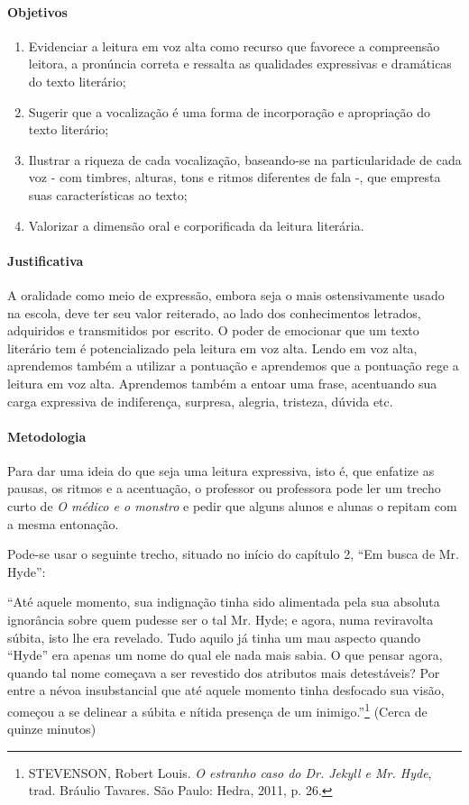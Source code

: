 \documentclass[12pt]{extarticle}
\begin{document}
{\paragraph{Objetivos}
\begin{enumerate}
\item
Evidenciar a leitura em voz alta como recurso que favorece a
compreensão leitora, a pronúncia correta e ressalta as qualidades
expressivas e dramáticas do texto literário;

\item
Sugerir que a vocalização é uma forma de incorporação e apropriação do texto
literário;

\item
Ilustrar a riqueza de cada vocalização, baseando-se na
particularidade de cada voz - com timbres, alturas, tons e ritmos
diferentes de fala -, que empresta suas características ao texto;

\item
Valorizar a dimensão oral e corporificada da leitura literária.
\end{enumerate}

\paragraph{Justificativa}
A oralidade como meio de expressão, embora seja o mais ostensivamente
usado na escola, deve ter seu valor reiterado, ao lado dos conhecimentos
letrados, adquiridos e transmitidos por escrito. O poder de emocionar
que um texto literário tem é potencializado pela leitura em voz alta.
Lendo em voz alta, aprendemos também a utilizar a pontuação e aprendemos
que a pontuação rege a leitura em voz alta. Aprendemos também a entoar
uma frase, acentuando sua carga expressiva de indiferença, surpresa,
alegria, tristeza, dúvida etc.

\paragraph{Metodologia}
Para dar uma ideia do que seja uma leitura expressiva, isto é, que
enfatize as pausas, os ritmos e a acentuação, o professor ou professora
pode ler um trecho curto de \emph{O médico e o monstro} e pedir que
alguns alunos e alunas o repitam com a mesma entonação.

Pode-se usar o seguinte trecho, situado no início do capítulo 2, ``Em
busca de Mr. Hyde'':

``Até aquele momento, sua indignação tinha sido alimentada pela sua
absoluta ignorância sobre quem pudesse ser o tal Mr. Hyde; e agora, numa
reviravolta súbita, isto lhe era revelado. Tudo aquilo já tinha um mau
aspecto quando ``Hyde'' era apenas um nome do qual ele nada mais sabia.
O que pensar agora, quando tal nome começava a ser revestido dos
atributos mais detestáveis? Por entre a névoa insubstancial que até
aquele momento tinha desfocado sua visão, começou a se delinear a súbita
e nítida presença de um inimigo.''\footnote{STEVENSON, Robert Louis.
  \emph{O estranho caso do Dr. Jekyll e Mr. Hyde}, trad. Bráulio
  Tavares. São Paulo: Hedra, 2011, p. 26.}
(Cerca de quinze minutos)

}
\end{document}
